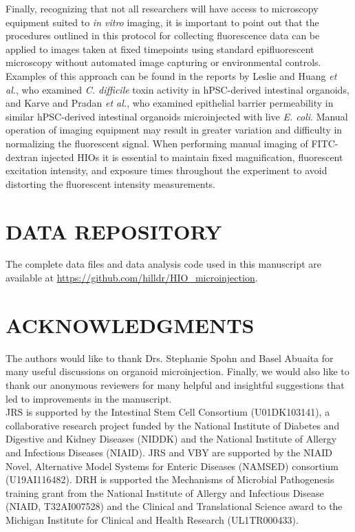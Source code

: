 \documentclass[11pt]{article}
\begin{document}
Finally, recognizing that not all researchers will have access to microscopy equipment suited to \emph{in vitro} imaging, it is important to point out that the procedures outlined in this protocol for collecting fluorescence data can be applied to images taken at fixed timepoints using standard epifluorescent microscopy without automated image capturing or environmental controls. Examples of this approach can be found in the reports by Leslie and Huang \emph{et al.}\supercite{Leslie:2015}, who examined \emph{C. difficile} toxin activity in hPSC-derived intestinal organoids, and Karve and Pradan \emph{et al.}\supercite{Karve:2017}, who examined epithelial barrier permeability in similar hPSC-derived intestinal organoids microinjected with live \emph{E. coli}. Manual operation of imaging equipment may result in greater variation and difficulty in normalizing the fluorescent signal. When performing manual imaging of FITC-dextran injected HIOs it is essential to maintain fixed magnification, fluorescent excitation intensity, and exposure times throughout the experiment to avoid distorting the fluorescent intensity measurements.\\

\section*{DATA REPOSITORY}
The complete data files and data analysis code used in this manuscript are available at  \url{https://github.com/hilldr/HIO_microinjection}.\\


\section*{ACKNOWLEDGMENTS}
The authors would like to thank Drs. Stephanie Spohn and Basel Abuaita for many useful discussions on organoid microinjection. Finally, we would also like to thank our anonymous reviewers for many helpful and insightful suggestions that led to improvements in the manuscript.\\
JRS is supported by the Intestinal Stem Cell Consortium (U01DK103141), a collaborative research project funded by the National Institute of Diabetes and Digestive and Kidney Diseases (NIDDK) and the National Institute of Allergy and Infectious Diseases (NIAID). JRS and VBY are supported by the NIAID Novel, Alternative Model Systems for Enteric Diseases (NAMSED) consortium (U19AI116482). DRH is supported the Mechanisms of Microbial Pathogenesis training grant from the National Institute of Allergy and Infectious Disease (NIAID, T32AI007528) and the Clinical and Translational Science award to the Michigan Institute for Clinical and Health Research (UL1TR000433).\\
\end{document}
